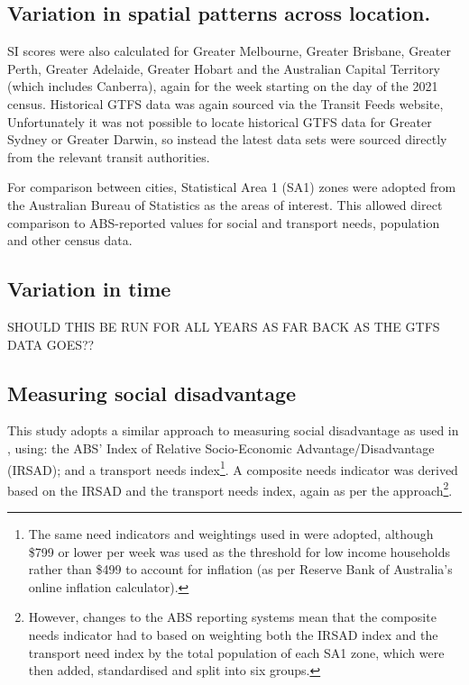 \documentclass[preprint, 3p,
authoryear]{elsarticle} %
\begin{document}
\subsection{Variation in spatial patterns across
location.}\label{variation-in-spatial-patterns-across-location.}

SI scores were also calculated for Greater Melbourne, Greater Brisbane,
Greater Perth, Greater Adelaide, Greater Hobart and the Australian
Capital Territory (which includes Canberra), again for the week starting
on the day of the 2021 census. Historical GTFS data was again sourced
via the Transit Feeds website, Unfortunately it was not possible to
locate historical GTFS data for Greater Sydney or Greater Darwin, so
instead the latest data sets were sourced directly from the relevant
transit authorities.

For comparison between cities, Statistical Area 1 (SA1) zones were
adopted from the Australian Bureau of Statistics \citep{ABSmaps} as the
areas of interest. This allowed direct comparison to ABS-reported values
for social and transport needs, population and other census data.

\subsection{Variation in time}\label{variation-in-time}

SHOULD THIS BE RUN FOR ALL YEARS AS FAR BACK AS THE GTFS DATA GOES??

\subsection{Measuring social
disadvantage}\label{measuring-social-disadvantage}

This study adopts a similar approach to measuring social disadvantage as
used in \citet{currie2010identifying}, using: the ABS' Index of Relative
Socio-Economic Advantage/Disadvantage (IRSAD); and a transport needs
index\footnote{The same need indicators and weightings used in
  \citet{currie2010identifying} were adopted, although \$799 or lower
  per week was used as the threshold for low income households rather
  than \$499 to account for inflation (as per Reserve Bank of
  Australia's online inflation calculator).}. A composite needs
indicator was derived based on the IRSAD and the transport needs index,
again as per the \citet{currie2010identifying} approach\footnote{However,
  changes to the ABS reporting systems mean that the composite needs
  indicator had to based on weighting both the IRSAD index and the
  transport need index by the total population of each SA1 zone, which
  were then added, standardised and split into six groups.}.
\end{document}
